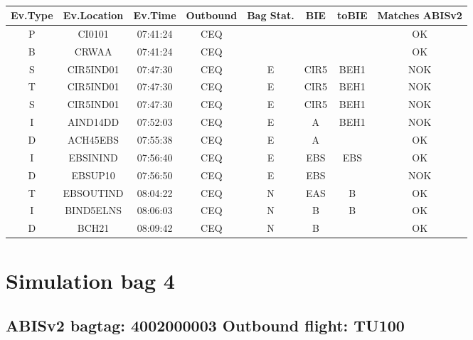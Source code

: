 \documentclass{report}
\begin{document}
\paragraph{}
\begin{longtable}{cccccccc}    \toprule
\rowcolor{white!50}
\textbf{Ev.Type} & \textbf{Ev.Location} & \textbf{Ev.Time} & \textbf{Outbound} & \textbf{Bag Stat.} & \textbf{BIE} & \textbf{toBIE} & \textbf{Matches ABISv2} \\\midrule
P & CI0101 & 07:41:24  & CEQ &  &  &  & OK\\
B & CRWAA & 07:41:24  & CEQ &  &  &  & OK\\
S & CIR5IND01 & 07:47:30  & CEQ & E & CIR5 & BEH1 & NOK\\
T & CIR5IND01 & 07:47:30  & CEQ & E & CIR5 & BEH1 & NOK\\
S & CIR5IND01 & 07:47:30  & CEQ & E & CIR5 & BEH1 & NOK\\
I & AIND14DD & 07:52:03  & CEQ & E & A & BEH1 & NOK\\
D & ACH45EBS & 07:55:38  & CEQ & E & A &  & OK\\
I & EBSININD & 07:56:40  & CEQ & E & EBS & EBS & OK\\
D & EBSUP10 & 07:56:50  & CEQ & E & EBS &  & NOK\\
T & EBSOUTIND & 08:04:22  & CEQ & N & EAS & B & OK\\
I & BIND5ELNS & 08:06:03  & CEQ & N & B & B & OK\\
D & BCH21 & 08:09:42  & CEQ & N & B &  & OK\\
\bottomrule
\end{longtable}
\pagebreak
\section*{Simulation bag 4}
\subsection*{ABISv2 bagtag: 4002000003 Outbound flight: TU100}
\end{document}
